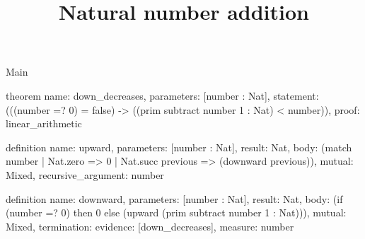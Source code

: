 \begin{lexlean}{Main}
\title{Natural number addition}
\begin{semanticmodule}
theorem{
  name: down_decreases,
  parameters: [number : Nat],
  statement: (((number =? 0) = false) -> ((prim subtract number 1 : Nat) < number)),
  proof: linear_arithmetic{}
}

definition{
  name: upward,
  parameters: [number : Nat],
  result: Nat,
  body: (match number | Nat.zero => 0 | Nat.succ previous => (downward previous)),
  mutual: Mixed,
  recursive_argument: number
}

definition{
  name: downward,
  parameters: [number : Nat],
  result: Nat,
  body: (if (number =? 0) then 0 else (upward (prim subtract number 1 : Nat))),
  mutual: Mixed,
  termination: {evidence: [down_decreases], measure: number}
}
\end{semanticmodule}
\end{lexlean}
